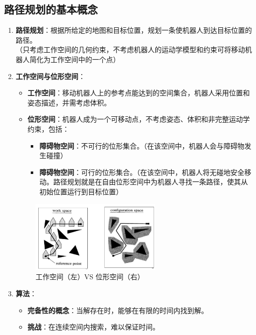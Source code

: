 \documentclass[../main.tex]{subfiles}
\begin{document}
\subsection{路径规划的基本概念}\label{subsec:pathplanning_basic}
\begin{enumerate}
    \item \textbf{路径规划}：根据所给定的地图和目标位置，规划一条使机器人到达目标位置的路径。
    \\{\small\kaishu （只考虑工作空间的几何约束，不考虑机器人的运动学模型和约束可将移动机器人简化为工作空间中的一个点）}
    \item \textbf{工作空间与位形空间}：
    \begin{itemize}
        \item \textbf{工作空间}：移动机器人上的参考点能达到的空间集合，机器人采用位置和姿态描述，并需考虑体积。
        \item \textbf{位形空间}：机器人成为一个可移动点，不考虑姿态、体积和非完整运动学约束，包括：
            \begin{itemize}
                \item \textbf{障碍物空间}：不可行的位形集合。{\small\kaishu （在该空间中，机器人会与障碍物发生碰撞）}
                \item \textbf{障碍物空间}：可行的位形集合。{\small\kaishu （在该空间中，机器人将无碰地安全移动。路径规划就是在自由位形空间中为机器人寻找一条路径，使其从初始位置运行到目标位置）}
            \end{itemize}
    \end{itemize}
    \begin{figure}[H]
        \centering
        \includegraphics[width=0.6\textwidth]{images/1.png}
        \caption{工作空间（左）VS 位形空间（右）}
    \end{figure}
    \item \textbf{算法}：
        \begin{itemize}
            \item \textbf{完备性的概念}：当解存在时，能够在有限的时间内找到解。
            \item \textbf{挑战}：在连续空间内搜索，难以保证时间。

\end{itemize}
\end{enumerate}
\end{document}
